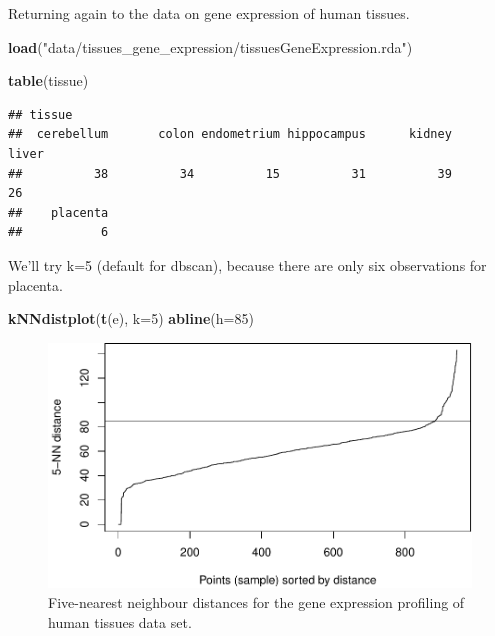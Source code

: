 \documentclass[]{book}
\newenvironment{Shaded}{\begin{snugshade}}{\end{snugshade}}
\newcommand{\KeywordTok}[1]{\textcolor[rgb]{0.13,0.29,0.53}{\textbf{{#1}}}}
\newcommand{\DataTypeTok}[1]{\textcolor[rgb]{0.13,0.29,0.53}{{#1}}}
\newcommand{\DecValTok}[1]{\textcolor[rgb]{0.00,0.00,0.81}{{#1}}}
\newcommand{\StringTok}[1]{\textcolor[rgb]{0.31,0.60,0.02}{{#1}}}
\newcommand{\NormalTok}[1]{{#1}}
\theoremstyle{definition}
\theoremstyle{definition}
\theoremstyle{definition}
\theoremstyle{remark}
\begin{document}
Returning again to the data on gene expression of human tissues.

\begin{Shaded}
\begin{Highlighting}[]
\KeywordTok{load}\NormalTok{(}\StringTok{"data/tissues_gene_expression/tissuesGeneExpression.rda"}\NormalTok{)}
\end{Highlighting}
\end{Shaded}

\begin{Shaded}
\begin{Highlighting}[]
\KeywordTok{table}\NormalTok{(tissue)}
\end{Highlighting}
\end{Shaded}

\begin{verbatim}
## tissue
##  cerebellum       colon endometrium hippocampus      kidney       liver 
##          38          34          15          31          39          26 
##    placenta 
##           6
\end{verbatim}

We'll try k=5 (default for dbscan), because there are only six
observations for placenta.

\begin{Shaded}
\begin{Highlighting}[]
\KeywordTok{kNNdistplot}\NormalTok{(}\KeywordTok{t}\NormalTok{(e), }\DataTypeTok{k=}\DecValTok{5}\NormalTok{)}
\KeywordTok{abline}\NormalTok{(}\DataTypeTok{h=}\DecValTok{85}\NormalTok{)}
\end{Highlighting}
\end{Shaded}

\begin{figure}

{\centering \includegraphics[width=0.75\linewidth]{09-clustering_files/figure-latex/tissueExpressionKNNdist-1} 

}

\caption{Five-nearest neighbour distances for the gene expression profiling of human tissues data set.}\label{fig:tissueExpressionKNNdist}
\end{figure}
\end{document}
